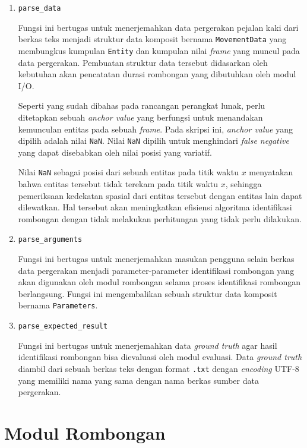 \begin{enumerate}
    \item \texttt{parse\_data}
    
    Fungsi ini bertugas untuk menerjemahkan data pergerakan pejalan kaki dari berkas teks menjadi struktur data komposit bernama \texttt{MovementData} yang membungkus kumpulan \texttt{Entity} dan kumpulan nilai \textit{frame} yang muncul pada data pergerakan. Pembuatan struktur data tersebut didasarkan oleh kebutuhan akan pencatatan durasi rombongan yang dibutuhkan oleh modul I/O.
    
    Seperti yang sudah dibahas pada rancangan perangkat lunak, perlu ditetapkan sebuah \textit{anchor value} yang berfungsi untuk menandakan kemunculan entitas pada sebuah \textit{frame}. Pada skripsi ini, \textit{anchor value} yang dipilih adalah nilai \texttt{NaN}. Nilai \texttt{NaN} dipilih untuk menghindari \textit{false negative} yang dapat disebabkan oleh nilai posisi yang variatif.

    Nilai \texttt{NaN} sebagai posisi dari sebuah entitas pada titik waktu $x$ menyatakan bahwa entitas tersebut tidak terekam pada titik waktu $x$, sehingga pemeriksaan kedekatan spasial dari entitas tersebut dengan entitas lain dapat dilewatkan. Hal tersebut akan meningkatkan efisiensi algoritma identifikasi rombongan dengan tidak melakukan perhitungan yang tidak perlu dilakukan. 
    
    \item \texttt{parse\_arguments}
    
    Fungsi ini bertugas untuk menerjemahkan masukan pengguna selain berkas data pergerakan menjadi parameter-parameter identifikasi rombongan yang akan digunakan oleh modul rombongan selama proses identifikasi rombongan berlangsung. Fungsi ini mengembalikan sebuah struktur data komposit bernama \texttt{Parameters}.
    
    \item \texttt{parse\_expected\_result}
    
    Fungsi ini bertugas untuk menerjemahkan data \textit{ground truth} agar hasil identifikasi rombongan bisa dievaluasi oleh modul evaluasi. Data \textit{ground truth} diambil dari sebuah berkas teks dengan format \texttt{.txt} dengan \textit{encoding} UTF-8 yang memiliki nama yang sama dengan nama berkas sumber data pergerakan. 
\end{enumerate}

\section{Modul Rombongan}
\label{sec:impl-rombongan}

